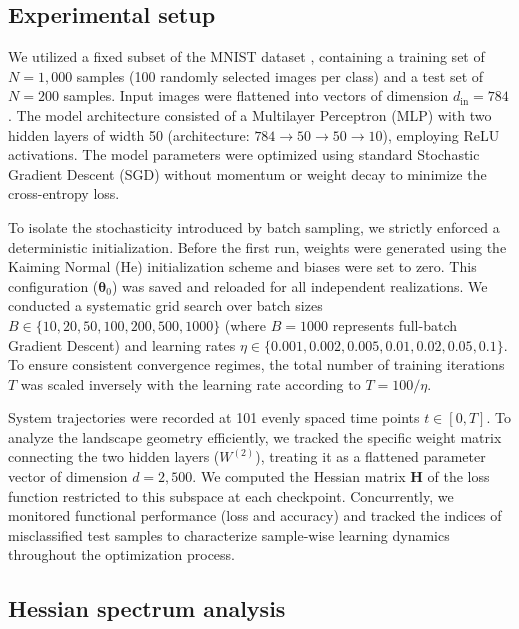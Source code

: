 \documentclass[aps,prx,preprint,superscriptaddress,nofootinbib]{revtex4-2}
\begin{document}
\subsection{Experimental setup}

We utilized a fixed subset of the MNIST dataset \cite{lecun1998gradient}, containing a training set of $N=1,000$ samples (100 randomly selected images per class) and a test set of $N=200$ samples. Input images were flattened into vectors of dimension $d_\mathrm{in}=784$. The model architecture consisted of a Multilayer Perceptron (MLP) with two hidden layers of width 50 (architecture: $784 \to 50 \to 50 \to 10$), employing ReLU activations. The model parameters were optimized using standard Stochastic Gradient Descent (SGD) without momentum or weight decay to minimize the cross-entropy loss.

To isolate the stochasticity introduced by batch sampling, we strictly enforced a deterministic initialization. Before the first run, weights were generated using the Kaiming Normal (He) initialization scheme and biases were set to zero. This configuration ($\bm{\theta}_0$) was saved and reloaded for all independent realizations. We conducted a systematic grid search over batch sizes $B \in \{10, 20, 50, 100, 200, 500, 1000\}$ (where $B=1000$ represents full-batch Gradient Descent) and learning rates $\eta \in \{0.001, 0.002, 0.005, 0.01, 0.02, 0.05, 0.1\}$. To ensure consistent convergence regimes, the total number of training iterations $T$ was scaled inversely with the learning rate according to $T = 100 / \eta$.

System trajectories were recorded at 101 evenly spaced time points $t \in [0, T]$. To analyze the landscape geometry efficiently, we tracked the specific weight matrix connecting the two hidden layers ($W^{(2)}$), treating it as a flattened parameter vector of dimension $d=2,500$. We computed the Hessian matrix $\mathbf{H}$ of the loss function restricted to this subspace at each checkpoint. Concurrently, we monitored functional performance (loss and accuracy) and tracked the indices of misclassified test samples to characterize sample-wise learning dynamics throughout the optimization process.

\subsection{Hessian spectrum analysis}
\end{document}
